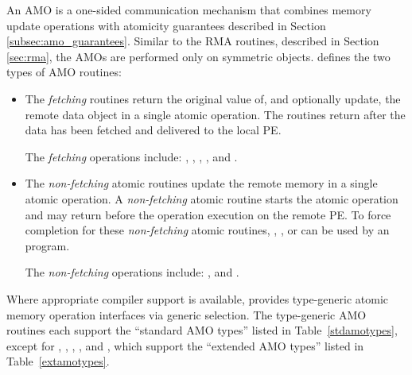 An \ac{AMO} is a one-sided communication mechanism that combines memory update
operations with atomicity guarantees described in Section
\ref{subsec:amo_guarantees}.  Similar to the \ac{RMA} routines, described in
Section \ref{sec:rma}, the \acp{AMO} are performed only on symmetric objects.
\openshmem{} defines the two types of \ac{AMO} routines:
\begin{itemize}
\item %
The \textit{fetching} routines return the original value of, and optionally
update, the remote data object in a single atomic operation.  The routines 
return after the data has been fetched and delivered to the local \ac{PE}.

The \textit{fetching} operations include: ,
, , , and .

\item %
The \textit{non-fetching} atomic routines update the remote memory in a single
atomic operation.  A \textit{non-fetching} atomic routine starts the atomic
operation and may return before the operation execution on the remote \ac{PE}.
To force completion for these \textit{non-fetching} atomic routines,
, , or  can be
used by an \openshmem{} program. 

The \textit{non-fetching} operations include: ,  and
.
\end{itemize}

Where appropriate compiler support is available, \openshmem{} provides
type-generic atomic memory operation interfaces via \Celev{} generic selection.
The type-generic \ac{AMO} routines each support the ``standard \ac{AMO} types''
listed in Table~\ref{stdamotypes}, except for ,
, , , and
, which support the ``extended \ac{AMO} types'' listed in
Table~\ref{extamotypes}.

